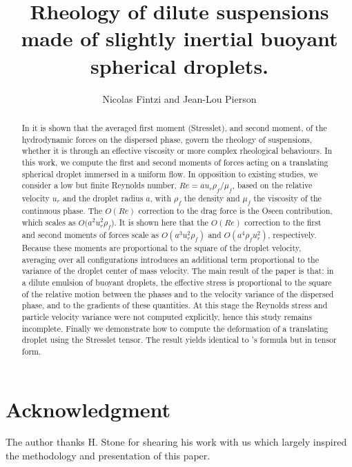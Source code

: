 \documentclass[12pt]{My_preprint}
\title{
    Rheology of dilute suspensions made of slightly inertial buoyant spherical droplets. 
    }
\author[1,2]{Nicolas Fintzi and  Jean-Lou Pierson}
\begin{document}
\maketitle

\begin{abstract}
    In \citet{lhuillier1996contribution} it is shown that the averaged first moment (Stresslet), and second moment, of the hydrodynamic forces on the dispersed phase, govern the rheology of suspensions, whether it is through an effective viscosity or more complex rheological behaviours. 
    In this work, we compute the first and second moments of forces acting on a translating spherical droplet immersed in a uniform flow. 
    In opposition to existing studies, we consider a low but finite Reynolds number, $Re =a u_r \rho_f/\mu_f$, based on the relative velocity $u_r$ and the droplet radius $a$, with $\rho_f$ the density and $\mu_f$ the viscosity of the continuous phase. 
    The $O(Re)$ correction to the drag force is the Oseen contribution, which scales as $O(a^2 u_r^2 \rho_f$). 
    It is shown here that the $O(Re)$ correction to the first and second moments of forces scale as $O(a^3 u_r^2 \rho_f)$ and $O( a^4 \rho_f u_r^2)$, respectively. 
    Because these moments are proportional to the square of the droplet velocity, averaging over all configurations introduces an additional term proportional to the variance of the droplet center of mass velocity. 
    The main result of the paper is that: in a dilute emulsion of buoyant droplets, the effective stress is proportional to the square of the relative motion between the phases and to the velocity variance of the dispersed phase, and to the gradients of these quantities.
    At this stage the Reynolds stress and particle velocity variance were not computed explicitly, hence this study remains incomplete.
    Finally we demonstrate how to compute the deformation of a translating droplet using the Stresslet tensor.
    The result yields identical to \citet{taylor1964deformation}'s formula but in tensor form. 
\end{abstract}










\section*{Acknowledgment}

The author thanks H. Stone for shearing his work with us \citep{stone2001inertial} which largely inspired the methodology and presentation of this paper. 



\appendix


\end{document}
